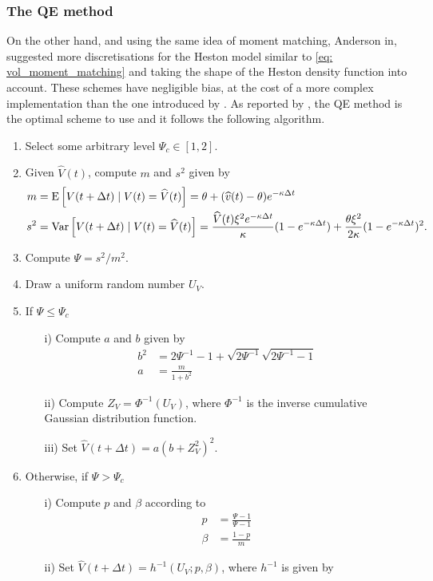 \subsubsection*{The QE method}\label{sec:The QE method}
On the other hand, and using the same idea of moment matching, Anderson in\cite{andersen2007efficient}, suggested  more discretisations for the Heston model similar to \eqref{eq: vol_moment_matching} and taking the shape of the Heston density function into
account.  These schemes have negligible bias, at the cost of a more complex implementation than  the one introduced by \cite{andersen2005extended}. As reported by \cite{andersen2007efficient}, the QE method is the optimal scheme to use and it follows the following algorithm.
\begin{enumerate}
\item Select some arbitrary level $\Psi_c \in [1,2]$.
\item  Given $\hat{V}(t)$, compute $m$ and $s^2$ given by
\begin{align*}
m &=\mathrm{E}\left[V(t+\Delta t) \mid V(t)=\widehat{V}(t)\right]=\theta+(\widehat{v}(t)-\theta) e^{-\kappa \Delta t} \\
s^2 &= \text{Var}\left[V(t+\Delta t) \mid V(t)=\widehat{V}(t)\right]=\frac{\widehat{V}(t) \xi^2 e^{-\kappa \Delta t}}{\kappa} (1-e^{-\kappa \Delta t}) +\frac{\theta \xi^2}{2 \kappa} (1-e^{-\kappa \Delta t})^2.
\end{align*}
\item Compute $\Psi=s^2/m^2$.
\item Draw a uniform random number $U_V$.
\item If $\Psi\le \Psi_c$
\begin{enumerate}
\item[i)] Compute $a$ and $b$ given by
\begin{align*}
b^2&=2 \Psi^{-1}-1+\sqrt{2 \Psi^{-1}}\sqrt{2 \Psi^{-1}-1}\\
a&=\frac{m}{1+b^2}
\end{align*}
\item[ii)] Compute $Z_V=\Phi^{-1}(U_V)$, where $\Phi^{-1}$ is the inverse cumulative
Gaussian distribution function.
\item[iii)] Set $\hat{V}(t+\Delta t)=a(b+Z_V^2)^2$.
\end{enumerate}
\item Otherwise, if $\Psi >\Psi_c$

\begin{enumerate}
\item[i)] Compute $p$ and $\beta$ according to 
\begin{align*}
p&=\frac{\Psi-1}{\Psi-1}\\
\beta&=\frac{1-p}{m}
\end{align*}
\item[ii)] Set $\hat{V}(t+\Delta t)=h^{-1}(U_V; p,\beta)$, where $h^{-1}$ is given by


\end{enumerate}
\end{enumerate}
